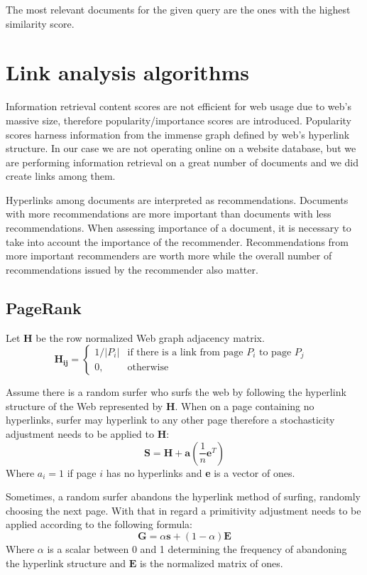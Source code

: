 \documentclass[10pt, a4paper]{article}
\begin{document}
The most relevant documents for the given query are the ones with the highest similarity score.

\section{Link analysis algorithms} \label{linkovi}
Information retrieval content scores are not efficient for web usage due to web's massive size, therefore popularity/importance scores are introduced. Popularity scores harness information from the immense graph defined by web's hyperlink structure. In our case we are not operating online on a website database, but we are performing information retrieval on a great number of documents and we did create links among them. 

Hyperlinks among documents are interpreted as recommendations. Documents with more recommendations are more important than documents with less recommendations. When assessing importance of a document, it is necessary to take into account the importance of the recommender. Recommendations from more important recommenders are worth more while the overall number of recommendations issued by the recommender also matter.

\subsection{PageRank}
Let $\mathbf{H}$ be the row normalized Web graph adjacency matrix.
$$
\mathbf{H_{ij}} = 
\begin{cases}
  1 / |P_i| & \text{if there is a link from page $P_i$ to page $P_j$ }\\
    0,              & \text{otherwise}
\end{cases}
$$

Assume there is a random surfer who surfs the web by following the hyperlink structure of the Web represented by \textbf{H}. When on a page containing no hyperlinks, surfer may hyperlink to any other page therefore a stochasticity adjustment needs to be applied to \textbf{H}:
$$
\mathbf{S} = \mathbf{H} + \mathbf{a}(\frac{1}{n} \mathbf{e}^T)
$$
Where $a_i = 1$ if page $i$ has no hyperlinks and \textbf{e} is a vector of ones.

Sometimes, a random surfer abandons the hyperlink method of surfing, randomly choosing the next page. With that in regard a primitivity adjustment needs to be applied according to the following formula:
$$
\mathbf{G} = \alpha \mathbf{s} + (1-\alpha)\mathbf{E}
$$
Where $\alpha$ is a scalar between 0 and 1 determining the frequency of abandoning the hyperlink structure and $\mathbf{E}$ is the
normalized matrix of ones.
\end{document}
